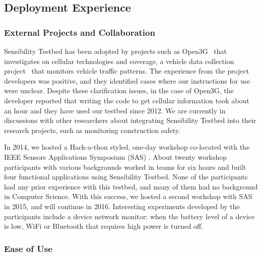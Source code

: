

\subsection{Deployment Experience}\label{sec-deployment}


\subsubsection{External Projects and Collaboration}\label{sec-external}

Sensibility Testbed has been adopted by projects such as 
Open3G~\cite{open3g} that investigates on cellular technologies 
and coverage, a vehicle data collection project~\cite{reininger2015first} 
that monitors vehicle traffic patterns. The experience from the 
project developers was positive, and they identified cases where our 
instructions for use were unclear. Despite these clarification issues, in 
the case of Open3G, the developer reported that writing the code to
get cellular information took about an hour and they have used our
testbed since 2012. We are currently in discussions with other 
researchers about integrating Sensibility Testbed into their research
projects, such as monitoring construction safety.

In 2014, we hosted a Hack-a-thon styled, one-day workshop co-located with 
the IEEE Sensors Applications Symposium (SAS) \cite{sas}. About twenty 
workshop participants with various backgrounds worked in teams 
for six hours and built four functional applications using Sensibility 
Testbed. None of the participants had any prior experience with 
this testbed, and many of them had no background in Computer
Science. With this success, we hosted a second workshop with 
SAS in 2015, and will continue in 2016. Interesting experiments 
developed by the participants include a device network monitor: 
when the battery level of a device is low, WiFi or Bluetooth that 
requires high power is turned off.

\subsubsection{Ease of Use}\label{sec-ease}


